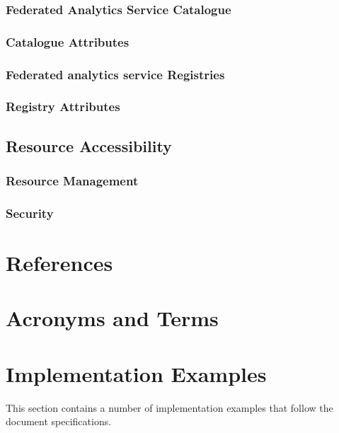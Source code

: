 \documentclass[12pt]{article}
\begin{document}
\subsubsection{Federated Analytics Service Catalogue}
\subsubsection{Catalogue Attributes}
\subsubsection{Federated analytics service Registries}
\subsubsection{Registry Attributes}

\subsection{Resource Accessibility}
\subsubsection{Resource Management}
\subsubsection{Security}




\section*{References}



\appendix

\section{Acronyms and Terms}


\begin{quote}
    
\end{quote}



\section{Implementation Examples}

This section contains a number of implementation examples that follow the document specifications.
\end{document}

